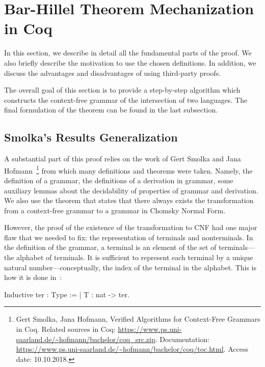 \section{Bar-Hillel Theorem Mechanization in Coq}
\label{sec:main}

In this section, we describe in detail all the fundamental parts of the proof. 
We also briefly describe the motivation to use the chosen definitions. 
In addition, we discuss the advantages and disadvantages of using third-party proofs. 

The overall goal of this section is to provide a step-by-step algorithm which constructs the context-free grammar of the intersection of two languages.
The final formulation of the theorem can be found in the last subsection. 
   
\subsection{ Smolka's Results Generalization}
\label{sec:solka-generalized}

A substantial part of this proof relies on the work of Gert Smolka and Jana Hofmann~\cite{smolkaHofmann2016}\footnote{Gert Smolka, Jana Hofmann, Verified Algorithms for Context-Free Grammars in Coq. Related sources in Coq: \url{https://www.ps.uni-saarland.de/~hofmann/bachelor/coq_src.zip}. Documentation: \url{https://www.ps.uni-saarland.de/~hofmann/bachelor/coq/toc.html}. Access date: 10.10.2018.} from which many definitions and theorems were taken. Namely, the definition of a grammar, the definitions of a derivation in grammar, some auxiliary lemmas about the decidability of properties of grammar and derivation. We also use the theorem that states that there always exists the transformation from a context-free grammar to a grammar in Chomsky Normal Form.

However, the proof of the existence of the transformation to CNF had one major flaw that we needed to fix: the representation of terminals and nonterminals.
In the definition of the grammar, a terminal is an element of the set of terminals---the alphabet of terminals. 
It is sufficient to represent each terminal by a unique natural number---conceptually, the index of the terminal in the alphabet. 
This is how it is done in~\cite{smolkaHofmann2016}: 

	\begin{pyglist}[language=coq, numbers=none, numbersep=5pt]
  Inductive ter : Type := | T : nat -> ter.
	\end{pyglist}


